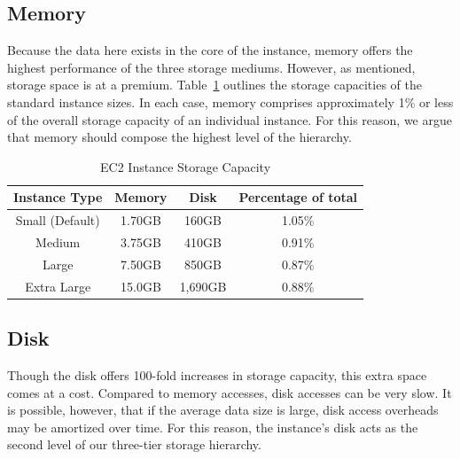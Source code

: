 \subsection{Memory} %
\label{sub:storage_memory}
Because the data here exists in the core of the instance, memory offers the
highest performance of the three storage mediums. However, as mentioned,
storage space is at a premium. Table~\ref{tab:mem_ec2_instance} outlines the
storage capacities of the standard instance sizes. In each case, memory
comprises approximately 1\% or less of the overall storage capacity of an
individual instance. For this reason, we argue that memory should compose the
highest level of the hierarchy.

\begin{table}[htp]
  \begin{center}
    \begin{tabular}{|c|c c| c|}
      \hline
      \multicolumn{1}{|c}{\textbf{Instance Type}} &
      \multicolumn{1}{|c}{\textbf{Memory}} &
			\multicolumn{1}{c|}{\textbf{Disk}} &
			\multicolumn{1}{c|}{\textbf{Percentage of total}}\\
      \hline
			Small (Default)     & 1.70GB & 160GB & 1.05\%\\
								   Medium & 3.75GB & 410GB & 0.91\%\\
						        Large & 7.50GB & 850GB & 0.87\%\\
				      Extra Large & 15.0GB & 1,690GB & 0.88\%\\
      \hline
    \end{tabular}
    \caption{EC2 Instance Storage Capacity}
    \label{tab:mem_ec2_instance}
  \end{center}
\end{table}


\subsection{Disk} %
\label{sub:storage_disk}
Though the disk offers 100-fold increases in storage capacity, this extra space
comes at a cost. Compared to memory accesses, disk accesses can be very slow.
It is possible, however, that if the average data size is large, disk access
overheads may be amortized over time. For this reason, the instance's disk acts
as the second level of our three-tier storage hierarchy.



